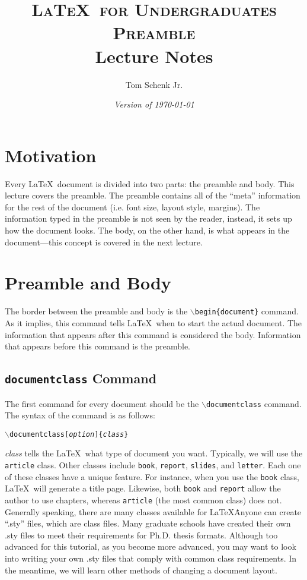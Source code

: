 \documentclass{article}
\title{\textsc{\LaTeX\ for Undergraduates\\
			Preamble} \\
			Lecture Notes}
\author{Tom Schenk Jr.}
\date{\textit{Version of \today}}
\begin{document}
\maketitle

\section{Motivation}

Every \LaTeX\ document is divided into two parts: the preamble and body. This lecture covers the preamble. The preamble contains all of the ``meta'' information for the rest of the document (i.e. font size, layout style, margins). The information typed in the preamble is not seen by the reader, instead, it sets up how the document looks. The body, on the other hand, is what appears in the document---this concept is covered in the next lecture.

\section{Preamble and Body}

The border between the preamble and body is the \texttt{$\backslash$begin\{document\}} command. As it implies, this command tells \LaTeX\ when to start the actual document. The information that appears after this command is considered the body. Information that appears before this command is the preamble.

\subsection{\texttt{documentclass} Command}

The first command for every document should be the \texttt{$\backslash$documentclass} command. The syntax of the command is as follows:
\begin{center}
	\texttt{$\backslash$documentclass[\textit{option}]\{\textit{class}\}}
\end{center}
\textit{class} tells the \LaTeX\ what type of document you want. Typically, we will use the \texttt{article} class. Other classes include \texttt{book}, \texttt{report}, \texttt{slides}, and \texttt{letter}. Each one of these classes have a unique feature. For instance, when you use the \texttt{book} class, \LaTeX\ will generate a title page. Likewise, both \texttt{book} and \texttt{report} allow the author to use chapters, whereas \texttt{article} (the most common class) does not. Generally speaking, there are many classes available for \LaTeX\. Anyone can create ``.sty'' files, which are class files. Many graduate schools have created their own .sty files to meet their requirements for Ph.D. thesis formats. Although too advanced for this tutorial, as you become more advanced, you may want to look into writing your own .sty files that comply with common class requirements. In the meantime, we will learn other methods of changing a document layout.
\end{document}
